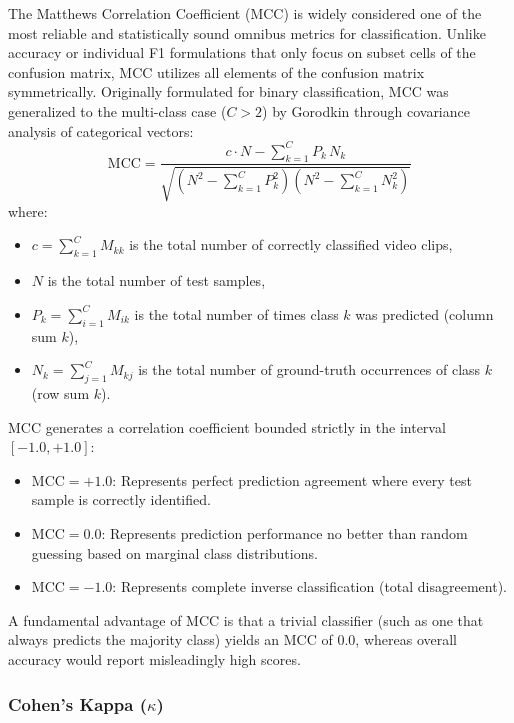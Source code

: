 The Matthews Correlation Coefficient (MCC) is widely considered one of the most reliable and statistically sound omnibus metrics for classification. Unlike accuracy or individual F1 formulations that only focus on subset cells of the confusion matrix, MCC utilizes all elements of the confusion matrix symmetrically. Originally formulated for binary classification, MCC was generalized to the multi-class case ($C > 2$) by Gorodkin through covariance analysis of categorical vectors:
\begin{equation}
\label{eq:mcc_multiclass}
\text{MCC} = \frac{c \cdot N - \sum_{k=1}^{C} P_k \, N_k}{\sqrt{\left(N^2 - \sum_{k=1}^{C} P_k^2\right) \left(N^2 - \sum_{k=1}^{C} N_k^2\right)}}
\end{equation}
where:
\begin{itemize}[leftmargin=*]
    \item $c = \sum_{k=1}^{C} M_{kk}$ is the total number of correctly classified video clips,
    \item $N$ is the total number of test samples,
    \item $P_k = \sum_{i=1}^{C} M_{ik}$ is the total number of times class $k$ was predicted (column sum $k$),
    \item $N_k = \sum_{j=1}^{C} M_{kj}$ is the total number of ground-truth occurrences of class $k$ (row sum $k$).
\end{itemize}
MCC generates a correlation coefficient bounded strictly in the interval $[-1.0, +1.0]$:
\begin{itemize}[leftmargin=*]
    \item $\text{MCC} = +1.0$: Represents perfect prediction agreement where every test sample is correctly identified.
    \item $\text{MCC} = 0.0$: Represents prediction performance no better than random guessing based on marginal class distributions.
    \item $\text{MCC} = -1.0$: Represents complete inverse classification (total disagreement).
\end{itemize}
A fundamental advantage of MCC is that a trivial classifier (such as one that always predicts the majority class) yields an MCC of $0.0$, whereas overall accuracy would report misleadingly high scores.

\subsubsection{Cohen's Kappa ($\kappa$)}

